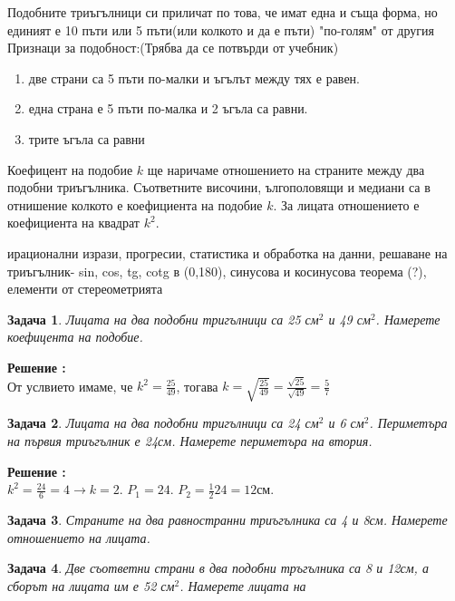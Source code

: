 \documentclass{article}
\newtheorem{problem}{Задача}
\newcounter{solution}
\newcommand\solution{%
	\stepcounter{solution}%
	\textbf{Решение :}\\%
}
\begin{document}
	\vspace{1cm}
	
	
	Подобните триъгълници си приличат по това, че имат една и съща форма, но единият е 10 пъти или 5 пъти(или колкото и да е пъти) "по-голям" от другия \\
	
		Признаци за подобност:(Трябва да се потвърди от учебник)
	\begin{enumerate}
		\item две страни са 5 пъти по-малки и ъгълът между тях е равен.
		\item една страна е 5 пъти по-малка и 2 ъгъла са равни.
 		\item  трите ъгъла са равни
 	\end{enumerate}
	
	Коефицент на подобие $k$ ще наричаме отношението на страните между два подобни триъгълника. Съответните височини, ългополовящи и медиани са в отнишение колкото е коефициента на подобие $k$. За лицата отношението е коефициента на квадрат $k^2$.
	
	\vspace{2cm}
	ирационални изрази, прогресии, статистика и обработка на данни, 
	решаване на триъгълник- sin, cos, tg, cotg в (0,180), синусова и косинусова теорема (?), елементи от стереометрията
	
	\begin{problem}
		Лицата на два подобни тригълници са 25 см$^2$ и 49 см$^2$. Намерете коефицента на подобие.
	\end{problem}
 \solution 
 От услвието имаме, че $k^2 = \frac{25}{49}$, тогава $ k = \sqrt{\frac{25}{49}} = \frac{\sqrt {25}}{ \sqrt {49}} = \frac{5}{7}  $	
	
	\begin{problem}
		Лицата на два подобни тригълници са 24 см$^2$ и 6 см$^2$. Периметъра на първия триъгълник е 24см. Намерете периметъра на втория.
	\end{problem}	

	\solution $ k^2 = \frac{24}{6} = 4 \to k = 2$. $P_1 = 24$. $ P_2 = \frac{1}{2}24 = 12$см. 


\begin{problem}
Страните на два равностранни триъгълника са 4 и 8см. Намерете отношението на лицата.
\end{problem}	

\begin{problem}
Две съответни страни в два подобни тръгълника са 8 и 12см, а сборът на лицата им е 52 см$^2$. Намерете лицата на 
\end{problem}	
 
\end{document}
